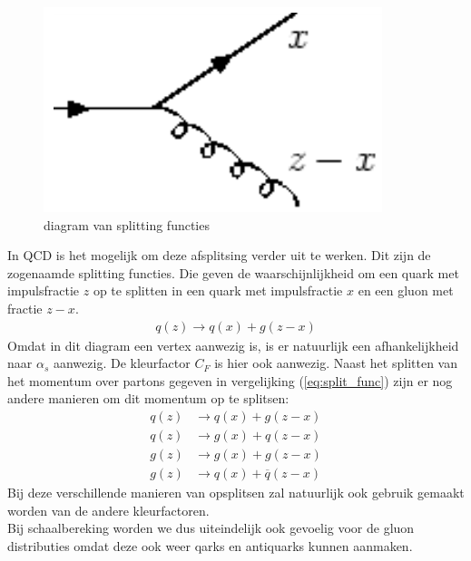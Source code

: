 \documentclass[../main.tex]{subfiles}
\begin{document}
\begin{figure}
    \centering
    \includegraphics[width=0.9\linewidth]{QCD/split_func.png}
    \caption{diagram van splitting functies}
    \label{fig:split_func}
\end{figure}
In QCD is het mogelijk om deze afsplitsing verder uit te werken. Dit zijn de zogenaamde splitting functies. Die geven de waarschijnlijkheid om een quark met impulsfractie $z$ op te splitten in een quark met impulsfractie $x$ en een gluon met fractie $z-x$.
\begin{equation}
    \begin{aligned}
        \label{eq:split_func}
        q(z)\rightarrow q(x) + g(z-x)
    \end{aligned}
\end{equation}
Omdat in dit diagram een vertex aanwezig is, is er natuurlijk een afhankelijkheid naar $\alpha_s$ aanwezig. De kleurfactor $C_F$ is hier ook aanwezig. Naast het splitten van het momentum over partons gegeven in vergelijking (\ref{eq:split_func}) zijn er nog andere manieren om dit momentum op te splitsen:
\begin{equation}
    \begin{aligned}
        \label{eq:split_func_all}
        q(z)&\rightarrow q(x) + g(z-x)\\
        q(z)&\rightarrow g(x) + q(z-x)\\
        g(z)&\rightarrow g(x) + g(z-x)\\
        g(z)&\rightarrow q(x) + \overline q(z-x)
    \end{aligned}
\end{equation}
Bij deze verschillende manieren van opsplitsen zal natuurlijk ook gebruik gemaakt worden van de andere kleurfactoren.\\
Bij schaalbereking worden we dus uiteindelijk ook gevoelig voor de gluon distributies omdat deze ook weer qarks en antiquarks kunnen aanmaken.
\end{document}

